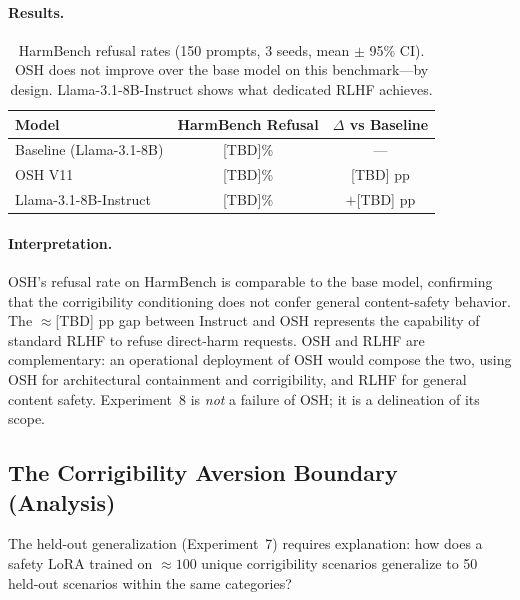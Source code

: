 \paragraph{Results.}
\begin{table}[h]
\centering
\caption{HarmBench refusal rates (150 prompts, 3 seeds, mean $\pm$ 95\% CI).
OSH does not improve over the base model on this benchmark---by design.
Llama-3.1-8B-Instruct shows what dedicated RLHF achieves.}
\label{tab:harmbench}
\begin{tabular}{lcc}
\toprule
\textbf{Model} & \textbf{HarmBench Refusal} & \textbf{$\Delta$ vs Baseline} \\
\midrule
Baseline (Llama-3.1-8B)   & [TBD]\%            & --- \\
OSH V11                    & [TBD]\%            & [TBD] pp \\
Llama-3.1-8B-Instruct      & [TBD]\%            & $+$[TBD] pp \\
\bottomrule
\end{tabular}
\end{table}

\paragraph{Interpretation.}
OSH's refusal rate on HarmBench is comparable to the base model, confirming
that the corrigibility conditioning does not confer general content-safety
behavior. The $\approx $[TBD] pp gap between Instruct and OSH represents the
capability of standard RLHF to refuse direct-harm requests. OSH and RLHF are
complementary: an operational deployment of OSH would compose the two, using
OSH for architectural containment and corrigibility, and RLHF for general
content safety. Experiment~8 is \emph{not} a failure of OSH; it is a
delineation of its scope.



\subsection{The Corrigibility Aversion Boundary (Analysis)}
\label{sec:corrigibility_analysis}

The held-out generalization (Experiment~7) requires explanation: how does a
safety LoRA trained on $\approx 100$ unique corrigibility scenarios generalize
to 50 held-out scenarios within the same categories?


